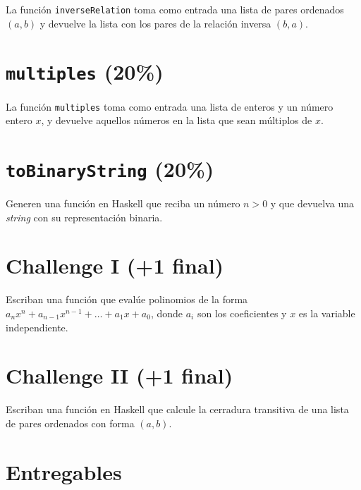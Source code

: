 \documentclass[]{article}
\theoremstyle{definition}
\begin{document}
La función \texttt{inverseRelation} toma como entrada una lista de pares ordenados $(a,b)$ y devuelve la lista con los pares de la relación inversa $(b,a)$.

\section{\texttt{multiples} (20\%)}

La función \texttt{multiples} toma como entrada una lista de enteros y un número entero $x$, y devuelve aquellos números en la lista que sean múltiplos de $x$.

\section{\texttt{toBinaryString} (20\%)}

Generen una función en Haskell que reciba un número $n > 0$ y que devuelva una \textit{string} con su representación binaria.

\pagebreak

\section*{Challenge I (+1 final)}

Escriban una función que evalúe polinomios de la forma $a_n x^n + a_{n-1} x^{n-1} + \dots + a_1 x + a_0$, donde $a_i$ son los coeficientes y $x$ es la variable independiente.

\section*{Challenge II (+1 final)}

Escriban una función en Haskell que calcule la cerradura transitiva de una lista de pares ordenados con forma $(a, b)$.

\vspace{10ex}

\section*{Entregables}

\bigskip
\end{document}
